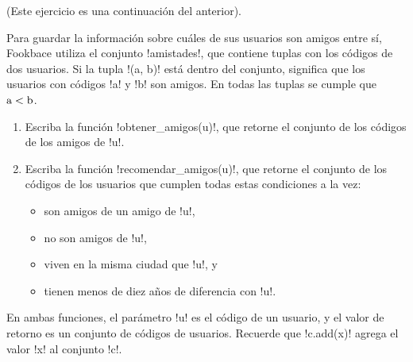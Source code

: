 (Este ejercicio es una continuación del anterior).

Para guardar la información sobre cuáles de sus usuarios son amigos entre sí,
Fookbace utiliza el conjunto \li!amistades!,
que contiene tuplas con los códigos de dos usuarios.
Si la tupla \li!(a, b)! está dentro del conjunto,
significa que los usuarios con códigos \li!a! y \li!b! son amigos.
En todas las tuplas se cumple que \(\text{\li!a!} < \text{\li!b!}\).

\begin{enumerate}
  \item Escriba la función \li!obtener_amigos(u)!,
    que retorne el conjunto de los códigos
    de los amigos de \li!u!.
  \item Escriba la función \li!recomendar_amigos(u)!,
    que retorne el conjunto de los códigos
    de los usuarios que cumplen todas estas condiciones a la vez:
    \begin{itemize}
      \item son amigos de un amigo de \li!u!,
      \item no son amigos de \li!u!,
      \item viven en la misma ciudad que \li!u!, y
      \item tienen menos de diez años de diferencia con \li!u!.
    \end{itemize}
\end{enumerate}
En ambas funciones,
el parámetro \li!u! es el código de un usuario,
y el valor de retorno es un conjunto de códigos de usuarios.
Recuerde que \li!c.add(x)! agrega el valor \li!x! al conjunto \li!c!.

